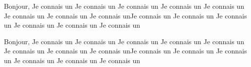 \documentclass{article}
\begin{document}
\numberpstartfalse
\renewcommand{\thepstart}{\vspace{1cm}{\hfill \Roman{pstart}\hfill} \par\nopagebreak[4]}

\begin{pages}
\begin{Leftside}\beginnumbering

\pstart Bonjour,
Je connais un Je connais un Je connais un Je connais un 
Je connais un Je connais un Je connais un Je connais unJe connais un Je connais un Je connais un Je connais un Je connais un Je connais un\pend
\endnumbering

\end{Leftside}
\begin{Rightside}
\beginnumbering

\pstart Bonjour,
Je connais un Je connais un Je connais un Je connais un 
Je connais un Je connais un Je connais un Je connais unJe connais un Je connais un Je connais un Je connais un Je connais un Je connais un\pend
\endnumbering
\end{Rightside}
\Pages
\end{pages}
\end{document}
